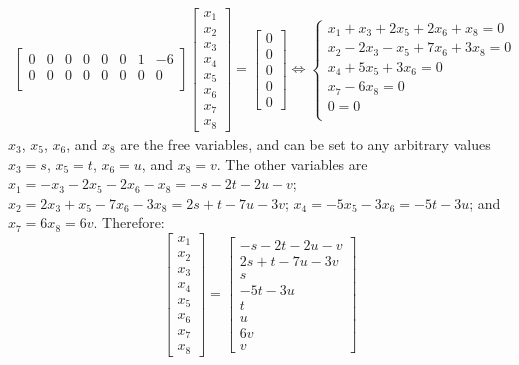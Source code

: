 \documentclass{article}
\begin{document}
\begin{itemize}
\begin{align*}
\begin{bmatrix}
0 & 0 &  0 & 0 &  0 &  0 & 1 & -6 \\ 
0 & 0 &  0 & 0 &  0 &  0 & 0 &  0 \\
\end{bmatrix}\begin{bmatrix} x_1 \\ x_2 \\ x_3 \\ x_4 \\ x_5 \\ x_6 \\ x_7 \\ x_8 \end{bmatrix} = \begin{bmatrix} 0 \\ 0 \\ 0 \\ 0 \\ 0 \end{bmatrix} 
\iff \left\{\begin{array}{c} 
x_1 + x_3 + 2x_5 + 2x_6 + x_8 = 0 \\ 
x_2 - 2x_3 - x_5 + 7x_6 + 3x_8 = 0 \\
x_4 + 5x_5 + 3x_6 = 0 \\
x_7 - 6x_8 = 0 \\ 
0 = 0 \\ 
\end{array}\right.
\end{align*}
\(x_3\), \(x_5\), \(x_6\), and \(x_8\) are the free variables, and can be set to any arbitrary values \(x_3 = s\), \(x_5 = t\), \(x_6 = u\), and \(x_8 = v\). The other variables are \(x_1 = -x_3 - 2x_5 - 2x_6 - x_8 = -s - 2t - 2u - v\); \(x_2 = 2x_3 + x_5 - 7x_6 - 3x_8 = 2s + t - 7u - 3v\); \(x_4 = -5x_5 - 3x_6 = -5t - 3u\); and \(x_7 = 6x_8 = 6v\). Therefore: 
\[\begin{bmatrix} x_1 \\ x_2 \\ x_3 \\ x_4 \\ x_5 \\ x_6 \\ x_7 \\ x_8 \end{bmatrix} 
= \begin{bmatrix} -s - 2t - 2u - v \\ 2s + t - 7u - 3v \\ s \\ -5t - 3u \\ t \\ u \\ 6v \\ v \end{bmatrix} 
\]
\end{itemize}
\end{document}
